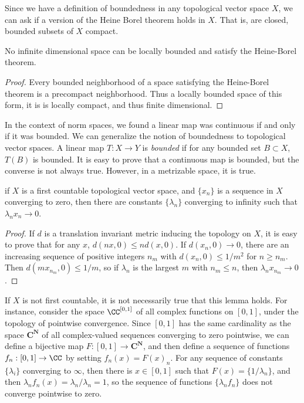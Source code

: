 Since we have a definition of boundedness in any topological vector space $X$, we can ask if a version of the Heine Borel theorem holds in $X$. That is, are closed, bounded subsets of $X$ compact.

\begin{corollary}
    No infinite dimensional space can be locally bounded and satisfy the Heine-Borel theorem.
\end{corollary}
\begin{proof}
    Every bounded neighborhood of a space satisfying the Heine-Borel theorem is a precompact neighborhood. Thus a locally bounded space of this form, it is is locally compact, and thus finite dimensional.
\end{proof}

In the context of norm spaces, we found a linear map was continuous if and only if it was bounded. We can generalize the notion of boundedness to topological vector spaces. A linear map $T: X \to Y$ is \emph{bounded} if for any bounded set $B \subset X$, $T(B)$ is bounded. It is easy to prove that a continuous map is bounded, but the converse is not always true. However, in a metrizable space, it is true.

\begin{lemma}
    if $X$ is a first countable topological vector space, and $\{ x_n \}$ is a sequence in $X$ converging to zero, then there are constants $\{ \lambda_n \}$ converging to infinity such that $\lambda_n x_n \to 0$.
\end{lemma}
\begin{proof}
    If $d$ is a translation invariant metric inducing the topology on $X$, it is easy to prove that for any $x$, $d(nx,0) \leq n d(x,0)$. If $d(x_n,0) \to 0$, there are an increasing sequence of positive integers $n_m$ with $d(x_n,0) \leq 1/m^2$ for $n \geq n_m$. Then $d(mx_{n_m},0) \leq 1/m$, so if $\lambda_n$ is the largest $m$ with $n_m \leq n$, then $\lambda_n x_{n_m} \to 0$.
\end{proof}

\begin{example}
    If $X$ is not first countable, it is not necessarily true that this lemma holds. For instance, consider the space $\CC^{[0,1]}$ of all complex functions on $[0,1]$, under the topology of pointwise convergence. Since $[0,1]$ has the same cardinality as the space $\mathbf{C}^{\mathbf{N}}$ of all complex-valued sequences converging to zero pointwise, we can define a bijective map $F: [0,1] \to \mathbf{C}^{\mathbf{N}}$, and then define a sequence of functions $f_n: [0,1] \to \CC$ by setting $f_n(x) = F(x)_n$. For any sequence of constants $\{ \lambda_i \}$ converging to $\infty$, then there is $x \in [0,1]$ such that $F(x) = \{ 1/\lambda_n \}$, and then $\lambda_n f_n(x) = \lambda_n/\lambda_n = 1$, so the sequence of functions $\{ \lambda_n f_n \}$ does not converge pointwise to zero.
\end{example}

